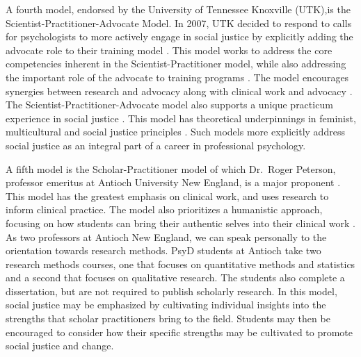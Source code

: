 \documentclass[
  11pt,
]{book}
\begin{document}
A fourth model, endorsed by the University of Tennessee Knoxville (UTK),is the Scientist-Practitioner-Advocate Model. In 2007, UTK decided to respond to calls for psychologists to more actively engage in social justice by explicitly adding the advocate role to their training model \citep{noauthor_scientist-practitioner_nodate}. This model works to address the core competencies inherent in the Scientist-Practitioner model, while also addressing the important role of the advocate to training programs \citep{mallinckrodt_scientist-practitioner-advocate_2014}. The model encourages synergies between research and advocacy along with clinical work and advocacy \citep{mallinckrodt_scientist-practitioner-advocate_2014}. The Scientist-Practitioner-Advocate model also supports a unique practicum experience in social justice \citep{mallinckrodt_scientist-practitioner-advocate_2014}. This model has theoretical underpinnings in feminist, multicultural and social justice principles \citep{noauthor_scientist-practitioner_nodate}. Such models more explicitly address social justice as an integral part of a career in professional psychology.

A fifth model is the Scholar-Practitioner model of which Dr.~Roger Peterson, professor emeritus at Antioch University New England, is a major proponent \citep{peterson_national_1997}. This model has the greatest emphasis on clinical work, and uses research to inform clinical practice. The model also prioritizes a humanistic approach, focusing on how students can bring their authentic selves into their clinical work \citep{deangelis_three_2003}. As two professors at Antioch New England, we can speak personally to the orientation towards research methods. PsyD students at Antioch take two research methods courses, one that focuses on quantitative methods and statistics and a second that focuses on qualitative research. The students also complete a dissertation, but are not required to publish scholarly research. In this model, social justice may be emphasized by cultivating individual insights into the strengths that scholar practitioners bring to the field. Students may then be encouraged to consider how their specific strengths may be cultivated to promote social justice and change.
\end{document}
